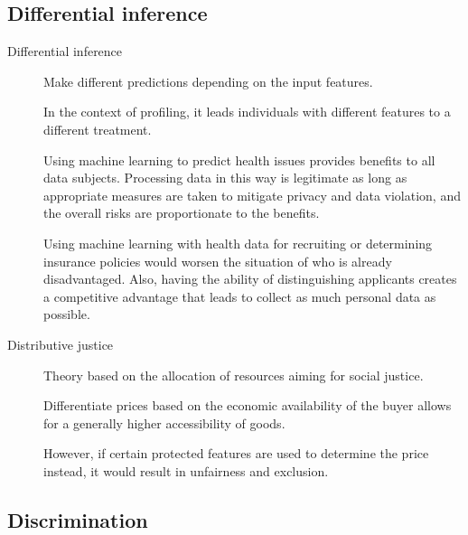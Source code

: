 \subsection{Differential inference}

\begin{description}
    \item[Differential inference] 
        Make different predictions depending on the input features. 
        
        In the context of profiling, it leads individuals with different features to a different treatment.

        \begin{example}[ML in healthcare]
            Using machine learning to predict health issues provides benefits to all data subjects. Processing data in this way is legitimate as long as appropriate measures are taken to mitigate privacy and data violation, and the overall risks are proportionate to the benefits.
        \end{example}
        
        \begin{example}
            Using machine learning with health data for recruiting or determining insurance policies would worsen the situation of who is already disadvantaged. Also, having the ability of distinguishing applicants creates a competitive advantage that leads to collect as much personal data as possible.
        \end{example}
\end{description}

\begin{description}
    \item[Distributive justice] 
        Theory based on the allocation of resources aiming for social justice.

        \begin{example}
            Differentiate prices based on the economic availability of the buyer allows for a generally higher accessibility of goods.

            However, if certain protected features are used to determine the price instead, it would result in unfairness and exclusion.
        \end{example}
\end{description}


\subsection{Discrimination}

